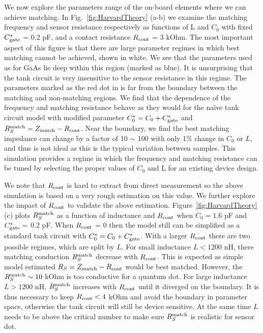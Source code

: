 \documentclass[twocolumn]{article}
\begin{document}
	We now explore the parameters range of the on-board elements where we can achieve matching. In Fig.\ \ref{fig:HarvardTheory} (a-b) we examine the matching frequency and sensor resistance respectively as functions of L and $C_0$ with fixed $C^*_{\rm gate}$ = 0.2 pF, and a contact resistance $R_{\rm cont}$ = 3 kOhm.  The most important aspect of this figure is that there are large parameter regimes in which best matching cannot be achieved, shown in white.  We see that the parameters used as for GaAs lie deep within this region (marked as blue). It is unsurprising that the tank circuit is very insensitive to the sensor resistance in this regime. The parameters marked as the red dot in is far from the boundary between the matching and non-matching regions. 
	We find that the dependence of the frequency and matching resistance behave as they would for the naïve tank circuit model with modified parameter $C^*_0 = C_0 + C^*_{\rm gate}$ and $R^{\rm match}_S = Z_{\rm match}-R_{\rm cont}$. Near the boundary, we find the best matching impedance can change by a factor of 10 $\sim$ 100 with only 1\% change in $C_0$ or $L$, and thus is not ideal as this is the typical variation between samples. This simulation provides a regime in which the frequency and matching resistance can be tuned by selecting the proper values of $C_0$ and L for an existing device design.   
	
	We note that $R_{\rm cont}$ is hard to extract from direct measurement so the above simulation is based on a very rough estimation on this value. We further explore the impact of $R_{\rm cont}$ to validate the above estimation. Figure\ \ref{fig:HarvardTheory}(c) plots $R^{\rm match}_S$ as a function of inductance and $R_{\rm cont}$ when $C_0 = 1.6$ pF and $C^*_{\rm gate} =$ 0.2 pF. When $R_{\rm cont}$ = 0 then the model still can be simplified as a standard tank circuit with $C^*_0 = C_0 + C^*_{\rm gate}$. 
	With a larger $R_{\rm cont}$ there are two possible regimes, which are split by $L$. For small inductance $L<1200$ nH, there matching conduction $R^{\rm match}_S$ decrease with $R_{\rm cont}$. This is expected as simple model estimated  $R_S = Z_{\rm match}-R_{\rm cont}$ would be best matched. However, the  $R^{\rm match}_S\sim 10$ kOhm is too conductive for a quantum dot. For large inductance $L>1200$ nH,  $R^{\rm match}_S$ increases with $R_{\rm cont}$ until it diverged on the boundary. It is thus necessary to keep $R_{\rm cont}<4$ kOhm and avoid the boundary in parameter space, otherwise the tank circuit will still be device sensitive. At the same time $L$ needs to be above the critical number to make sure  $R^{\rm match}_S$ is realistic for sensor dot. 
	 
\end{document}
